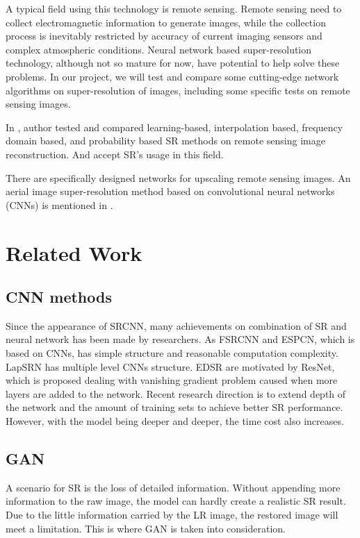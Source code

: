 \documentclass[10pt,twocolumn,letterpaper]{article}
\begin{document}
A typical field using this technology is remote sensing. 
Remote sensing need to collect electromagnetic information to generate images, while the collection process is inevitably restricted by accuracy of current imaging sensors and complex atmospheric conditions. 
Neural network based super-resolution technology, although not so mature for now, have potential to help solve these problems. 
In our project, we will test and compare some cutting-edge network algorithms on super-resolution of images, including some specific tests on remote sensing images.

In \cite{9}, author tested and compared learning-based, interpolation based, frequency domain based, 
and probability based SR methods on remote sensing image reconstruction. And accept SR's usage in this field.

There are specifically designed networks for upscaling remote sensing images. 
An aerial image super-resolution method based on convolutional neural networks (CNNs) is mentioned in \cite{10}.


\section{Related Work}
\subsection{CNN methods}
Since the appearance of SRCNN\cite{6}, many achievements on combination of SR and neural network has been made by researchers. 
As FSRCNN\cite{1} and ESPCN\cite{2}, which is based on CNNs, has simple structure and reasonable computation complexity. 
LapSRN\cite{3} has multiple level CNNs structure. 
EDSR\cite{4} are motivated by ResNet\cite{7}, which is proposed dealing with vanishing gradient problem caused when more layers are added to the network.
Recent research direction is to extend depth of the network and the amount of training sets to achieve better SR performance.
However, with the model being deeper and deeper, the time cost also increases.

\subsection{GAN}
A scenario for SR is the loss of detailed information. 
Without appending more information to the raw image, the model can hardly create a realistic SR result.
Due to the little information carried by the LR image, the restored image will meet a limitation.
This is where GAN is taken into consideration.
\end{document}
